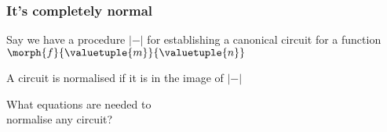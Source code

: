 \begin{frame}
    \frametitle{It's completely normal}

    \centering
    \LARGE

    Say we have a procedure \(|-|\) for
    establishing a \alert{canonical circuit} for a function
    \(\morph{f}{\valuetuple{m}}{\valuetuple{n}}\)

    \await

    \vspace{1em}

    A circuit is \alert{normalised} if it is in the image of \(|-|\)

    \await

    \vspace{1em}

    What equations are needed to \\ normalise any circuit?

\end{frame}

